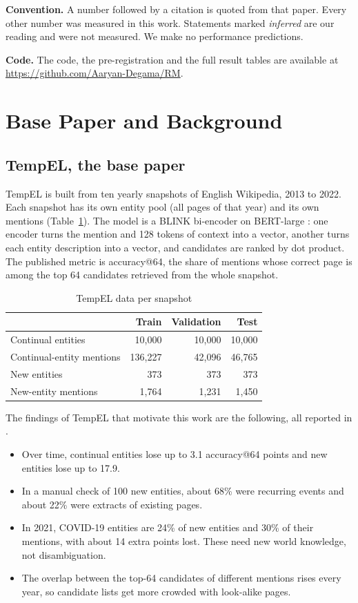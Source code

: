 \documentclass[conference]{IEEEtran}
\begin{document}
\textbf{Convention.} A number followed by a citation is quoted from that paper. Every other number was
measured in this work. Statements marked \emph{inferred} are our reading and were not measured. We make
no performance predictions.

\textbf{Code.} The code, the pre-registration and the full result tables are available at
\url{https://github.com/Aaryan-Degama/RM}.

\section{Base Paper and Background}

\subsection{TempEL, the base paper}

TempEL \cite{tempel} is built from ten yearly snapshots of English Wikipedia, 2013 to 2022. Each
snapshot has its own entity pool (all pages of that year) and its own mentions (Table~\ref{tab:tempel}).
The model is a BLINK bi-encoder \cite{blink} on BERT-large \cite{bert}: one encoder turns the mention
and 128 tokens of context into a vector, another turns each entity description into a vector, and
candidates are ranked by dot product. The published metric is accuracy@64, the share of mentions whose
correct page is among the top 64 candidates retrieved from the whole snapshot.

\begin{table}[t]
\caption{TempEL data per snapshot \cite{tempel}}
\label{tab:tempel}
\centering
\begin{tabular}{lrrr}
\toprule
 & Train & Validation & Test \\
\midrule
Continual entities & 10,000 & 10,000 & 10,000 \\
Continual-entity mentions & 136,227 & 42,096 & 46,765 \\
New entities & 373 & 373 & 373 \\
New-entity mentions & 1,764 & 1,231 & 1,450 \\
\bottomrule
\end{tabular}
\end{table}

The findings of TempEL that motivate this work are the following, all reported in \cite{tempel}.
\begin{itemize}
\item Over time, continual entities lose up to 3.1 accuracy@64 points and new entities lose up to 17.9.
\item In a manual check of 100 new entities, about 68\% were recurring events and about 22\% were
extracts of existing pages.
\item In 2021, COVID-19 entities are 24\% of new entities and 30\% of their mentions, with about 14
extra points lost. These need new world knowledge, not disambiguation.
\item The overlap between the top-64 candidates of different mentions rises every year, so candidate
lists get more crowded with look-alike pages.
\end{itemize}
\end{document}

